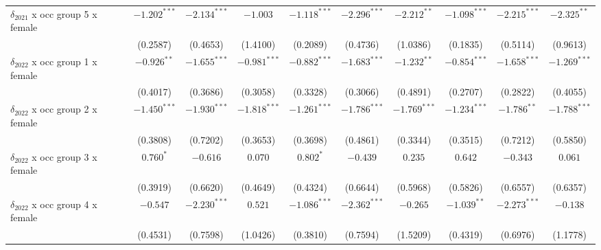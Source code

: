 \begin{tabular}{l|ccc|ccc|ccc|}
$\delta_{2021}$ x occ group 5 x female &          $-1.202^{***}$ &  $-2.134^{***}$ &        $-1.003$ &           $-1.118^{***}$ &  $-2.296^{***}$ &   $-2.212^{**}$ &           $-1.098^{***}$ &  $-2.215^{***}$ &   $-2.325^{**}$ \\
                                       &                (0.2587) &        (0.4653) &        (1.4100) &                 (0.2089) &        (0.4736) &        (1.0386) &                 (0.1835) &        (0.5114) &        (0.9613) \\
$\delta_{2022}$ x occ group 1 x female &           $-0.926^{**}$ &  $-1.655^{***}$ &  $-0.981^{***}$ &           $-0.882^{***}$ &  $-1.683^{***}$ &   $-1.232^{**}$ &           $-0.854^{***}$ &  $-1.658^{***}$ &  $-1.269^{***}$ \\
                                       &                (0.4017) &        (0.3686) &        (0.3058) &                 (0.3328) &        (0.3066) &        (0.4891) &                 (0.2707) &        (0.2822) &        (0.4055) \\
$\delta_{2022}$ x occ group 2 x female &          $-1.450^{***}$ &  $-1.930^{***}$ &  $-1.818^{***}$ &           $-1.261^{***}$ &  $-1.786^{***}$ &  $-1.769^{***}$ &           $-1.234^{***}$ &   $-1.786^{**}$ &  $-1.788^{***}$ \\
                                       &                (0.3808) &        (0.7202) &        (0.3653) &                 (0.3698) &        (0.4861) &        (0.3344) &                 (0.3515) &        (0.7212) &        (0.5850) \\
$\delta_{2022}$ x occ group 3 x female &               $0.760^*$ &        $-0.616$ &         $0.070$ &                $0.802^*$ &        $-0.439$ &         $0.235$ &                  $0.642$ &        $-0.343$ &         $0.061$ \\
                                       &                (0.3919) &        (0.6620) &        (0.4649) &                 (0.4324) &        (0.6644) &        (0.5968) &                 (0.5826) &        (0.6557) &        (0.6357) \\
$\delta_{2022}$ x occ group 4 x female &                $-0.547$ &  $-2.230^{***}$ &         $0.521$ &           $-1.086^{***}$ &  $-2.362^{***}$ &        $-0.265$ &            $-1.039^{**}$ &  $-2.273^{***}$ &        $-0.138$ \\
                                       &                (0.4531) &        (0.7598) &        (1.0426) &                 (0.3810) &        (0.7594) &        (1.5209) &                 (0.4319) &        (0.6976) &        (1.1778) \\

\end{tabular}
